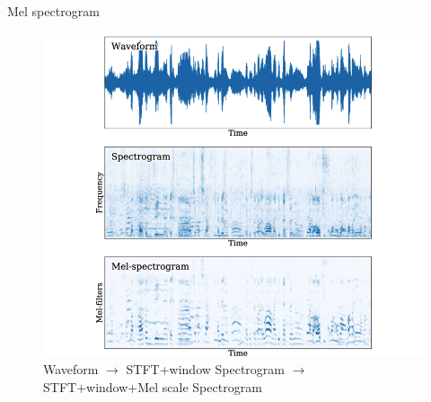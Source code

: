 \begin{frame}{Mel spectrogram}
	\begin{figure}
		\centering
		\includegraphics[width=0.8\linewidth]{figs/mel_spectrogram.png}
		\caption{Waveform $\rightarrow$ STFT+window Spectrogram $\rightarrow$ STFT+window+Mel scale Spectrogram}
	\end{figure}
\end{frame}
 